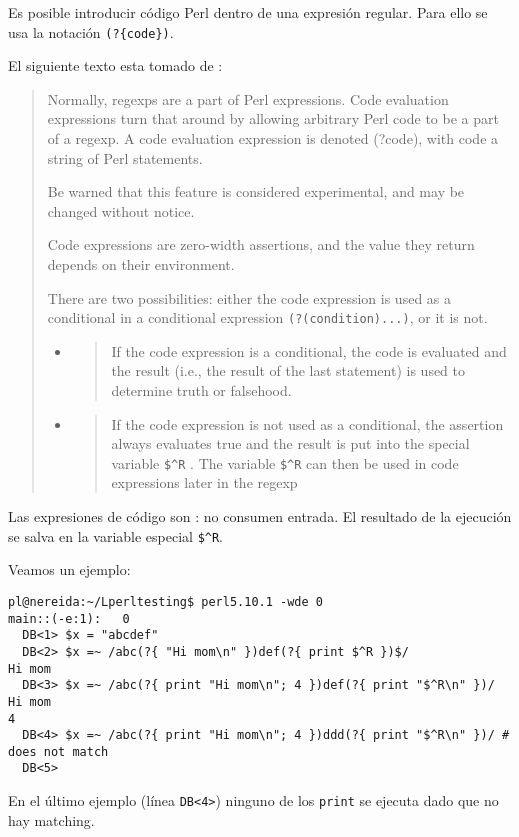 Es posible introducir código Perl dentro de una expresión regular.
Para ello se usa la notación \verb|(?{code})|.

El siguiente texto esta tomado de :

\begin{it}\begin{quote} 
Normally, regexps are a part of Perl expressions. Code evaluation
expressions turn that around by allowing arbitrary Perl code to be a
part of a regexp. A code evaluation expression is denoted (?{code}),
with code a string of Perl statements.

Be warned that this feature is considered experimental, and may be
changed without notice.

Code expressions are zero-width assertions, and the value they return
depends on their environment. 

There are two possibilities: either the
code expression is used as a conditional in a conditional expression
\verb|(?(condition)...)|, or it is not. 
\begin{itemize}
\item \begin{quote} 
If the code expression is a conditional,
the code is evaluated and the result (i.e., the result of the last
statement) is used to determine truth or falsehood. 

\end{quote} \item \begin{quote} If the code expression
is not used as a conditional, the assertion always evaluates true and
the result is put into the special variable \verb|$^R| . The variable \verb|$^R| can
then be used in code expressions later in the regexp
\end{quote}
\end{itemize}
\end{quote}\end{it} 


Las expresiones de código son : no consumen entrada.
El resultado de la ejecución se salva en la variable especial \verb|$^R|.

Veamos un ejemplo:

\begin{verbatim}
pl@nereida:~/Lperltesting$ perl5.10.1 -wde 0
main::(-e:1):   0
  DB<1> $x = "abcdef"
  DB<2> $x =~ /abc(?{ "Hi mom\n" })def(?{ print $^R })$/
Hi mom
  DB<3> $x =~ /abc(?{ print "Hi mom\n"; 4 })def(?{ print "$^R\n" })/
Hi mom
4
  DB<4> $x =~ /abc(?{ print "Hi mom\n"; 4 })ddd(?{ print "$^R\n" })/ # does not match
  DB<5>                                 
\end{verbatim}
En el último ejemplo (línea \verb|DB<4>|) ninguno de los \verb|print| se ejecuta dado que no hay matching.

